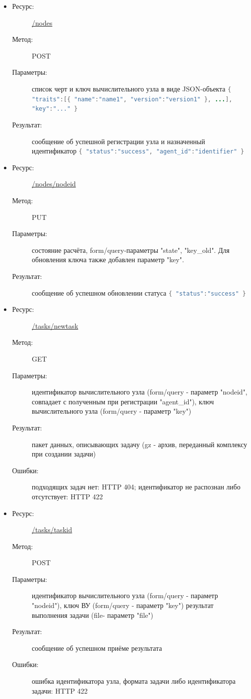 \documentclass[a4paper,12pt]{report}
\numberwithin{equation}{section}
\begin{document}
  \begin{itemize}
    \item
    \begin{description}
      \item[Ресурс:] \url{/nodes}
      \item[Метод:] POST
      \item[Параметры:] список черт и ключ вычислительного узла в виде JSON-объекта
       \lstinline[language=Java]|{ "traits":[{ "name":"name1", "version":"version1" }, ...], "key":"..." }|
      \item[Результат:] сообщение об успешной регистрации узла и назначенный идентификатор 
       \lstinline[language=Java]|{ "status":"success", "agent_id":"identifier" }|
    \end{description}
    \item
    \begin{description}
      \item[Ресурс:] \url{/nodes/nodeid}
      \item[Метод:] PUT
      \item[Параметры:] состояние расчёта, 
       form/query-параметры "state", "key\_old". Для обновления ключа также добавлен параметр "key".
      \item[Результат:] сообщение об успешном обновлении статуса
       \lstinline[language=Java]|{ "status":"success" }|
    \end{description}
    \item
    \begin{description}
      \item[Ресурс:] \url{/tasks/newtask}
      \item[Метод:] GET
      \item[Параметры:] идентификатор вычислительного узла (form/query - параметр "nodeid", совпадает с полученным при регистрации "agent\_id"), ключ вычислительного узла (form/query - параметр "key")
      \item[Результат:] пакет данных, описывающих задачу (gz - архив, переданный комплексу при создании задачи)
      \item[Ошибки:] подходящих задач нет: HTTP 404; идентификатор не распознан либо отсутствует: HTTP 422
    \end{description}
    \item
    \begin{description}
      \item[Ресурс:] \url{/tasks/taskid}
      \item[Метод:] POST
      \item[Параметры:] идентификатор вычислительного узла (form/query - параметр "nodeid"), ключ ВУ (form/query - параметр "key") результат выполнения задачи (file- параметр "file")
      \item[Результат:] сообщение об успешном приёме результата
      \item[Ошибки:] ошибка идентификатора узла, формата задачи либо идентификатора задачи: HTTP 422
    \end{description}
  \end{itemize}
  
\end{document}
